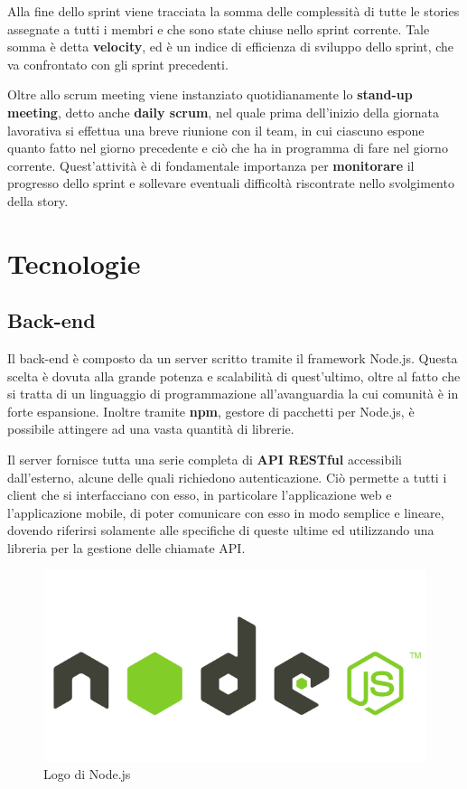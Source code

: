 Alla fine dello sprint viene tracciata la somma delle complessità di tutte le stories assegnate a tutti i membri e che sono state chiuse nello sprint corrente. Tale somma è detta \textbf{velocity}, ed è un indice di efficienza di sviluppo dello sprint, che va confrontato con gli sprint precedenti.

Oltre allo scrum meeting viene instanziato quotidianamente lo \textbf{stand-up meeting}, detto anche \textbf{daily scrum}, nel quale prima dell'inizio della giornata lavorativa si effettua una breve riunione con il team, in cui ciascuno espone quanto fatto nel giorno precedente e ciò che ha in programma di fare nel giorno corrente. Quest'attività è di fondamentale importanza per \textbf{monitorare} il progresso dello sprint e sollevare eventuali difficoltà riscontrate nello svolgimento della story. 

\section{Tecnologie}

\subsection{Back-end}

Il back-end è composto da un server scritto tramite il framework \gls{Node.js}. Questa scelta è dovuta alla grande potenza e scalabilità di quest'ultimo, oltre al fatto che si tratta di un linguaggio di programmazione all'avanguardia la cui comunità è in forte espansione. Inoltre tramite \textbf{npm}, gestore di pacchetti per Node.js, è possibile attingere ad una vasta quantità di librerie.

Il server fornisce tutta una serie completa di \textbf{\gls{API} \gls{REST}ful} accessibili dall'esterno, alcune delle quali richiedono autenticazione. Ciò permette a tutti i client che si interfacciano con esso, in particolare l'applicazione web e l'applicazione mobile, di poter comunicare con esso in modo semplice e lineare, dovendo riferirsi solamente alle specifiche di queste ultime ed utilizzando una libreria per la gestione delle chiamate API. 

\begin{figure}[htpd]
\centering
\includegraphics[width=\textwidth/2]{../immagini/node-js-logo}
\caption{Logo di Node.js}
\end{figure}

